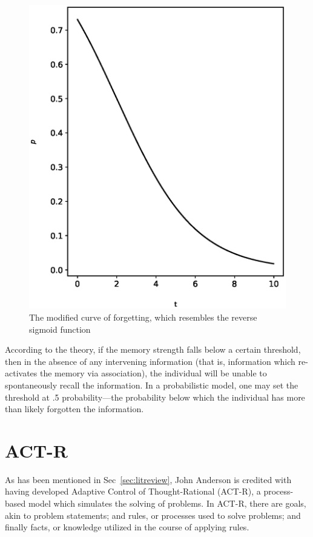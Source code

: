 \begin{figure}[p!]
 \label{fig:modified}
 \includegraphics{fig/modified.eps} 
 \caption{The modified curve of forgetting, which resembles the reverse
 sigmoid function}
\end{figure}

According to the theory, if the memory strength falls below a certain
threshold, then in the absence of any intervening information (that is,
information which re-activates the memory via association), the individual will
be unable to spontaneously recall the information.  In a probabilistic model,
one may set the threshold at .5 probability---the probability below which the
individual has more than likely forgotten the information. 

\section{ACT-R}

As has been mentioned in Sec~\ref{sec:litreview}, John Anderson is credited
with having developed Adaptive Control of Thought-Rational (ACT-R), a
process-based model which simulates the solving of problems.  In ACT-R, there
are goals, akin to problem statements; and rules, or processes used to solve
problems; and finally facts, or knowledge utilized in the course of applying
rules. 

